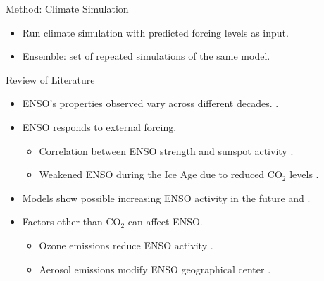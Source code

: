 \documentclass{beamer}
\begin{document}
\begin{frame}{Method: Climate Simulation}
  \begin{itemize}
  \item Run climate simulation with predicted forcing levels as input.
  \item \alert{Ensemble:} set of repeated simulations of the same model.
  \end{itemize}
\end{frame}

\begin{frame}{Review of Literature}
  \begin{itemize}
  \item ENSO's properties observed vary across different decades. \citep{lubbecke2014assessing}.
  \item ENSO responds to external forcing.
    \begin{itemize}
    \item Correlation between ENSO strength and sunspot activity \citep{emile2007nino}.
    \item Weakened ENSO during the Ice Age due to reduced CO$_2$ levels \citep{zhu2017reduced}.
    \end{itemize}
  \item Models show possible increasing ENSO activity in the future \citep{zheng2017response} and \citep{maher2018enso}.
  \item Factors other than CO$_2$ can affect ENSO.
    \begin{itemize}
    \item Ozone emissions reduce ENSO activity \citep{nowack2017role}.
    \item Aerosol emissions modify ENSO geographical center \citep{stevenson2017forced}.
    \end{itemize}
  \end{itemize}
\end{frame}
\end{document}
